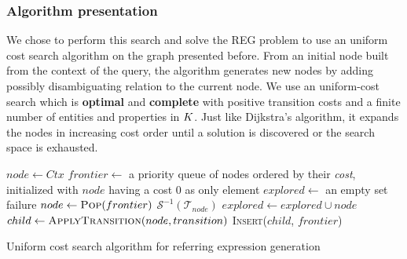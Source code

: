 \documentclass[a4paper,11pt,twoside]{StyleThese}
\begin{document}
\subsubsection{Algorithm presentation}
We chose to perform this search and solve the REG problem to use an uniform cost search algorithm on the graph presented before.
From an initial node built from the context of the query, the algorithm generates new nodes by adding possibly disambiguating relation to the current node. We use an uniform-cost search which is \textbf{optimal} and \textbf{complete} with positive transition costs and a finite number of entities and properties in $K$. Just like Dijkstra's algorithm, it expands the nodes in increasing cost order until a solution is discovered or the search space is exhausted.


\begin{algorithm}[H]
\begin{algorithmic}[1]
\State $node \leftarrow Ctx$
\State $frontier \leftarrow$ a priority queue of nodes ordered by their \textit{cost}, initialized with $node$ having a cost 0 as only element
\State $explored \leftarrow$ an empty set
\Loop
		\State \Return failure		
	\EndIf
	\State $node \leftarrow \textsc{Pop}(frontier)$
		\State \Return $\mathcal{S}^{-1}(\mathcal{T}_{node})$
	\EndIf
	\State $explored \leftarrow explored \cup node$
		\State $child \leftarrow \textsc{ApplyTransition}(node, transition)$
			\State \textsc{Insert}($child$, $frontier$)
		\EndIf
	\EndFor
\EndLoop
\EndFunction
\end{algorithmic}
 \caption{Uniform cost search algorithm for referring expression generation}
 \label{alg:reg}
\end{algorithm}
\end{document}
